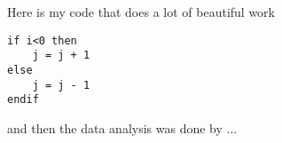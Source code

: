 \documentclass[a4paper]{article}
\begin{document}

Here is my code that does a lot of beautiful work

\begin{verbatim}
if i<0 then
	j = j + 1
else
	j = j - 1
endif
\end{verbatim}

and then the data analysis was done by ...
\end{document}
